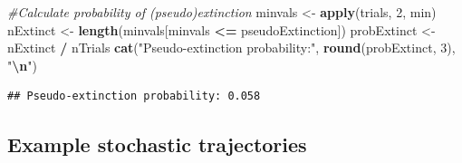 \documentclass[
  a4paper]{book}
\newenvironment{Shaded}{\begin{snugshade}}{\end{snugshade}}
\newcommand{\CommentTok}[1]{\textcolor[rgb]{0.56,0.35,0.01}{\textit{#1}}}
\newcommand{\DecValTok}[1]{\textcolor[rgb]{0.00,0.00,0.81}{#1}}
\newcommand{\FunctionTok}[1]{\textcolor[rgb]{0.13,0.29,0.53}{\textbf{#1}}}
\newcommand{\NormalTok}[1]{#1}
\newcommand{\OtherTok}[1]{\textcolor[rgb]{0.56,0.35,0.01}{#1}}
\newcommand{\SpecialCharTok}[1]{\textcolor[rgb]{0.81,0.36,0.00}{\textbf{#1}}}
\newcommand{\StringTok}[1]{\textcolor[rgb]{0.31,0.60,0.02}{#1}}
\begin{document}
\begin{Shaded}
\begin{Highlighting}[]
\CommentTok{\#Calculate probability of (pseudo)extinction}
\NormalTok{minvals }\OtherTok{\textless{}{-}} \FunctionTok{apply}\NormalTok{(trials, }\DecValTok{2}\NormalTok{, min)}
\NormalTok{nExtinct }\OtherTok{\textless{}{-}} \FunctionTok{length}\NormalTok{(minvals[minvals }\SpecialCharTok{\textless{}=}\NormalTok{ pseudoExtinction])}
\NormalTok{probExtinct }\OtherTok{\textless{}{-}}\NormalTok{ nExtinct }\SpecialCharTok{/}\NormalTok{ nTrials}
\FunctionTok{cat}\NormalTok{(}\StringTok{"Pseudo{-}extinction probability:"}\NormalTok{, }\FunctionTok{round}\NormalTok{(probExtinct, }\DecValTok{3}\NormalTok{), }\StringTok{"}\SpecialCharTok{\textbackslash{}n}\StringTok{"}\NormalTok{)}
\end{Highlighting}
\end{Shaded}

\begin{verbatim}
## Pseudo-extinction probability: 0.058
\end{verbatim}

\subsection{Example stochastic trajectories}\label{example-stochastic-trajectories}
\end{document}
